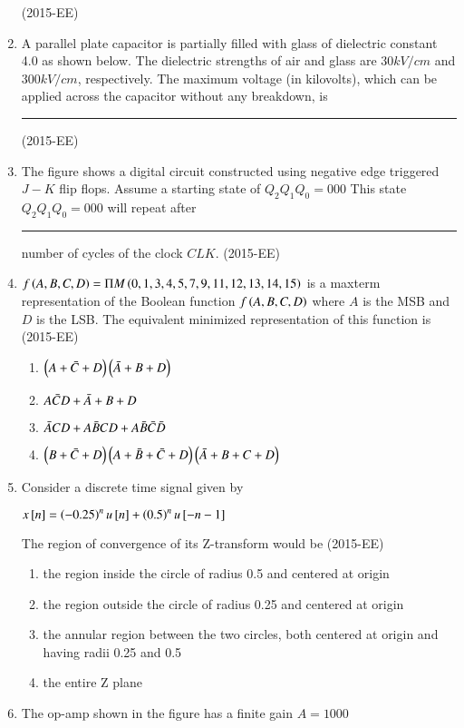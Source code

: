 \documentclass[journal]{IEEEtran}
\begin{document}
\begin{enumerate}
 \hfill(2015-EE)
 \item A parallel plate capacitor is partially filled with glass of dielectric constant 4.0 as shown below. The dielectric strengths of air and glass are $30 kV/cm$ and $300 kV/cm$, respectively. The maximum voltage (in kilovolts), which can be applied across the capacitor without any breakdown, is \rule{2cm}{0.4pt} \hfill(2015-EE)
 
 \item The figure shows a digital circuit constructed using negative edge triggered $J - K$
 flip flops. Assume a starting state of $Q_2Q_1Q_0 = 000$
 This state $Q_2Q_1Q_0 = 000$
 will repeat after \rule{1.5cm}{0.4pt} number of cycles of the clock $CLK$.
 \hfill (2015-EE)
 
 \item $f\left(A,B,C,D\right) = \Pi M \left(0,1,3,4,5,7,9,11,12,13,14,15\right)$ is a maxterm representation of the Boolean function $f\left(A,B,C,D\right)$ where $A$ is the MSB and $D$ is the LSB. The equivalent minimized representation of this function is \hfill(2015-EE)
 \begin{enumerate}
     \item $\left(A + \Bar{C} + D\right)\left(\Bar{A} + B + D\right)$
     \item $A\Bar{C}D + \Bar{A} + B + D$
     \item $\Bar{A}CD + A \Bar{B}CD + A\Bar{B}\Bar{C}\Bar{D}$
     \item $\left(B + \Bar{C} + D\right)\left(A + \Bar{B} + \Bar{C} + D\right) \left(\Bar{A} + B + C + D\right)$
 \end{enumerate}
 \item Consider a discrete time signal given by 
 \begin{center}
     $x{}\left[n\right] = \left(-0.25\right)^n u{}\left[n\right] + \left(0.5\right)^n u {}\left[-n-1\right]$
 \end{center}
 The region of convergence of its Z-transform would be \hfill (2015-EE)
 \begin{enumerate}
     \item the region inside the circle of radius 0.5 and centered at origin 
     \item the region outside the circle of radius 0.25 and centered at origin 
     \item the annular region between the two circles, both centered at origin and having radii 0.25 and 0.5
     \item the entire Z plane
 \end{enumerate}
 \item The op-amp shown in the figure has a finite gain $A= 1000$

\end{enumerate}
\end{document}
